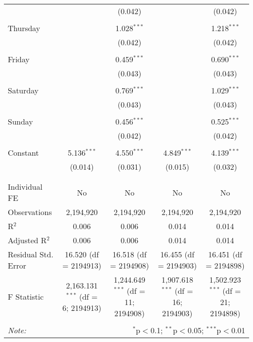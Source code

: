 \documentclass[
]{article}
\begin{document}
\begin{table}[!htbp]
{\begin{tabular}{@{\extracolsep{5pt}}lcccc}
  &  & (0.042) &  & (0.042) \\ 
  & & & & \\ 
 Thursday &  & 1.028$^{***}$ &  & 1.218$^{***}$ \\ 
  &  & (0.042) &  & (0.042) \\ 
  & & & & \\ 
 Friday &  & 0.459$^{***}$ &  & 0.690$^{***}$ \\ 
  &  & (0.043) &  & (0.043) \\ 
  & & & & \\ 
 Saturday &  & 0.769$^{***}$ &  & 1.029$^{***}$ \\ 
  &  & (0.043) &  & (0.043) \\ 
  & & & & \\ 
 Sunday &  & 0.456$^{***}$ &  & 0.525$^{***}$ \\ 
  &  & (0.042) &  & (0.042) \\ 
  & & & & \\ 
 Constant & 5.136$^{***}$ & 4.550$^{***}$ & 4.849$^{***}$ & 4.139$^{***}$ \\ 
  & (0.014) & (0.031) & (0.015) & (0.032) \\ 
  & & & & \\ 
\hline \\[-1.8ex] 
Individual FE & No & No & No & No \\ 
Observations & 2,194,920 & 2,194,920 & 2,194,920 & 2,194,920 \\ 
R$^{2}$ & 0.006 & 0.006 & 0.014 & 0.014 \\ 
Adjusted R$^{2}$ & 0.006 & 0.006 & 0.014 & 0.014 \\ 
Residual Std. Error & 16.520 (df = 2194913) & 16.518 (df = 2194908) & 16.455 (df = 2194903) & 16.451 (df = 2194898) \\ 
F Statistic & 2,163.131$^{***}$ (df = 6; 2194913) & 1,244.649$^{***}$ (df = 11; 2194908) & 1,907.618$^{***}$ (df = 16; 2194903) & 1,502.923$^{***}$ (df = 21; 2194898) \\ 
\hline 
\hline \\[-1.8ex] 
\textit{Note:}  & \multicolumn{4}{r}{$^{*}$p$<$0.1; $^{**}$p$<$0.05; $^{***}$p$<$0.01} \\ 
\end{tabular}
} 
\end{table} 
\newpage
\end{document}
